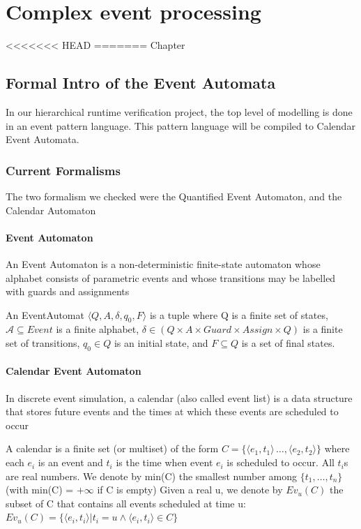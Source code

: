 \chapter{Complex event processing}
\label{chap:cep}
<<<<<<< HEAD
=======
Chapter
\section{Formal Intro of the Event Automata}
	In our hierarchical runtime verification project, the top level of modelling is done in an event pattern language.
	This pattern language will be compiled to Calendar Event Automata.
	\subsection{Current Formalisms}
		The two formalism we checked were the Quantified Event Automaton, and the Calendar Automaton
		\subsubsection{Event Automaton}
			An Event Automaton is a non-deterministic finite-state automaton whose alphabet consists
			of parametric events and whose transitions may be labelled with guards and assignments
			
			\begin{dfn}
			An EventAutomat 
			$\langle Q,A,\delta, q_0, F \rangle$ is a tuple where Q is a finite set of states, 
			$\mathcal{A} \subseteq Event$ is a finite alphabet,  %
			$\delta \in (Q \times A \times Guard \times Assign \times Q)$ is a finite set of transitions, 
			$q_0 \in Q$ is an initial state, and 
			$F \subseteq Q$ is a set of final states.
			\end{dfn}
			
		\subsubsection{Calendar Event Automaton}
			In discrete event simulation, a calendar (also called event list) is a data structure that
			stores future events and the times at which these events are scheduled to occur
			
			\begin{dfn}
			A calendar is a finite set (or multiset) of the form $C = \{ \langle e_1, t_1\rangle \, \dots ,\langle e_2, t_2\rangle \}$
			where each $e_i$ is an event and $t_i$ is the time when event $e_i$ is scheduled to occur. All $t_i$s are real numbers.
			We denote by min(C) the smallest number among $\{t_1,\dots ,t_n \}$ (with min(C) = $+\infty$ if C is empty)
			Given a real u, we denote by $Ev_u(C)$ the subset of C that contains all events scheduled at time u:
			$Ev_u(C) = \{ \langle e_i, t_i \rangle  | t_i = u \wedge \langle e_i , t_i \rangle \in C \} $
			\end{dfn}
			
